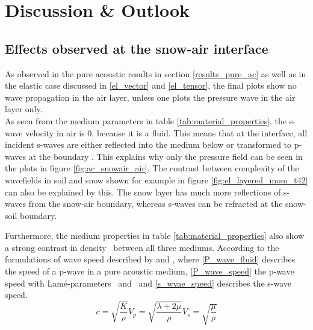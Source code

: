 \documentclass[a4paper,10pt]{article}
\begin{document}
\section{Discussion \& Outlook}
\subsection{Effects observed at the snow-air interface}

\noindent As observed in the pure acoustic results in section \ref{results_pure_ac} as well as in the elastic case discussed in \ref{el_vector} and \ref{el_tensor}, the final plots show no wave propagation in the air layer, unless one plots the pressure wave in the air layer only. \\

\noindent As seen from the medium parameters in table \ref{tab:material_properties}, the s-wave velocity in air is 0, because it is a fluid. This means that at the interface, all incident s-waves are either reflected into the medium below or transformed to p-waves at the boundary \parencite{borcherdtReflectionRefractionGeneral1982}. This explains why only the pressure field can be seen in the plots in figure \ref{fig:ac_snowair_air}. The contrast between complexity of the wavefields in soil and snow shown for example in figure \ref{fig:el_layered_mom_t42} can also be explained by this. The snow layer has much more reflections of s-waves from the snow-air boundary, whereas s-waves can be refracted at the snow-soil boundary.\

\noindent Furthermore, the medium properties in table \ref{tab:material_properties} also show a strong contrast in density \rho\ between all three mediums. According to the formulations of wave speed described by \cite{akiQuantitativeSeismology2002} and \cite{dennemanReflectionTransmissionWaves2002}, where \ref{P_wave_fluid} describes the speed of a p-wave in a pure acoustic medium, \ref{P_wave_speed} the p-wave speed with Lamé-parameters \lambda \  and \rho \ and \ref{s_wvae_speed} describes the s-wave speed. 
\begin{subequations}
    \label{Wavespeeds}
        \begin{equation}
            \label{P_wave_fluid}
        c = \sqrt{\frac{K}{\rho}}
        \end{equation}

        \begin{equation}
            \label{P_wave_speed}
            V_p = \sqrt{\frac{\lambda + 2\mu}{\rho}}
        \end{equation}

        \begin{equation}
            \label{s_wvae_speed}
            V_s = \sqrt{\frac{\mu}{\rho}}
        \end{equation}

    \end{subequations}
\end{document}
